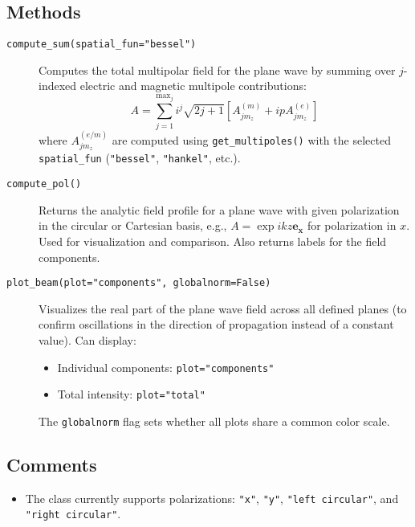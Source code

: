 \subsection{Methods}
\begin{description}
    \item[\texttt{compute\_sum(spatial\_fun="bessel")}]
    Computes the total multipolar field for the plane wave by summing over \( j \)-indexed electric and magnetic multipole contributions:
    \begin{equation}
    A = \sum_{j=1}^{{\text{max}_j}} i^j \sqrt{2j+1} \left[ A_{j m_z}^{(m)} + i p A_{j m_z}^{(e)} \right]
    \end{equation}
    where \( A_{j m_z}^{(e/m)} \) are computed using \texttt{get\_multipoles()} with the selected \texttt{spatial\_fun} (\texttt{"bessel"}, \texttt{"hankel"}, etc.).

    \item[\texttt{compute\_pol()}]
    Returns the analytic field profile for a plane wave with given polarization in the circular or Cartesian basis, e.g., \( A = \exp{ikz}\mathbf{e_x} \) for polarization in \( x \). Used for visualization and comparison. Also returns labels for the field components.

    \item[\texttt{plot\_beam(plot="components", globalnorm=False)}]
    Visualizes the real part of the plane wave field across all defined planes (to confirm oscillations in the direction of propagation instead of a constant value). Can display:
    \begin{itemize}
        \item Individual components: \texttt{plot="components"}
        \item Total intensity: \texttt{plot="total"}
    \end{itemize}
    The \texttt{globalnorm} flag sets whether all plots share a common color scale.
\end{description}

\subsection{Comments}
\begin{itemize}
    \item The class currently supports polarizations: \texttt{"x"}, \texttt{"y"}, \texttt{"left circular"}, and \texttt{"right circular"}.
\end{itemize}